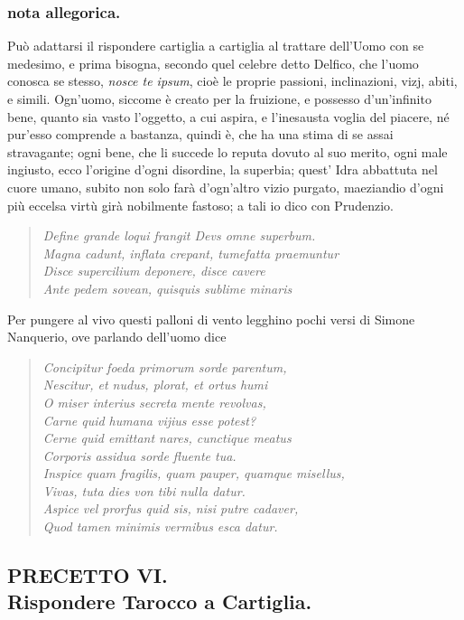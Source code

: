 \documentclass[11pt,a6paper]{article}
\newcommand{\literaryquote}[1]{%
\kern -6pt  \begin{verse}
    {\footnotesize \it #1}
  \end{verse}\kern -2pt%
}
\begin{document}
\subsubsection{nota allegorica.}
{\footnotesize
Può adattarsi il rispondere cartiglia a cartiglia
al trattare dell'Uomo con se medesimo, e prima
bisogna, secondo quel celebre detto Delfico, che
l'uomo conosca se stesso, \textit{nosce te ipsum}, cioè le
proprie passioni, inclinazioni, vizj, abiti, e simili.
Ogn'uomo, siccome è creato per la fruizione, e
possesso d'un'infinito bene, quanto sia vasto
l'oggetto, a cui aspira, e l'inesausta voglia del piacere,
né pur'esso comprende a bastanza, quindi è, che ha
una stima di se assai stravagante; ogni bene, che li
succede lo reputa dovuto al suo merito, ogni male
ingiusto, ecco l'origine d'ogni disordine, la superbia;
quest' Idra abbattuta nel cuore umano, subito
non solo farà d'ogn'altro vizio purgato, maeziandio
d'ogni più eccelsa virtù girà nobilmente fastoso;
a tali io dico con Prudenzio.
\literaryquote{Define grande loqui frangit Devs omne superbum.\\
Magna cadunt, inflata crepant, tumefatta praemuntur\\
Disce supercilium deponere, disce cavere \\
Ante pedem sovean, quisquis sublime minaris}

Per pungere al vivo questi palloni di vento legghino
pochi versi di Simone Nanquerio, ove parlando
dell'uomo dice
\literaryquote{Concipitur foeda primorum sorde parentum,\\
Nescitur, et nudus, plorat, et ortus humi\\
O miser interius secreta mente revolvas,\\
Carne quid humana vijius esse potest?\\
Cerne quid emittant nares, cunctique meatus\\
Corporis assidua sorde fluente tua.\\
Inspice quam fragilis, quam pauper, quamque misellus, \\
Vivas, tuta dies von tibi nulla datur.\\
Aspice vel prorfus quid sis, nisi putre cadaver, \\
Quod tamen minimis vermibus esca datur.
}
}
\subsection{PRECETTO VI.\\
 \footnotesize Rispondere Tarocco a Cartiglia.}
\end{document}
